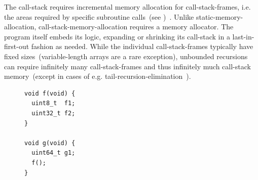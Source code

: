 The \gls{call-stack} requires incremental memory allocation for \glspl{call-stack-frame}, i.e. the areas required by specific subroutine calls~(see )~\cite{os-concepts,ia32,arm-isa}. Unlike \gls{static-memory-allocation}, \gls{call-stack-memory-allocation} requires a memory allocator. The program itself embeds its logic, expanding or shrinking its \gls{call-stack} in a last-in-first-out fashion as needed. While the individual \glspl{call-stack-frame} typically have fixed sizes~(variable-length arrays are a rare exception), unbounded recursions can require infinitely many \glspl{call-stack-frame} and thus infinitely much \gls{call-stack} memory~(except in cases of e.g. \gls{tail-recursion-elimination}~\cite{rec-elim}).

\begin{figure}[htb]
  \centering
  \begin{minipage}{0.35\textwidth}
    \begin{lstlisting}[style=C]
void f(void) {
  uint8_t  f1;
  uint32_t f2;
}

void g(void) {
  uint64_t g1;
  f();
}


\end{lstlisting}
\end{minipage}
\end{figure}
